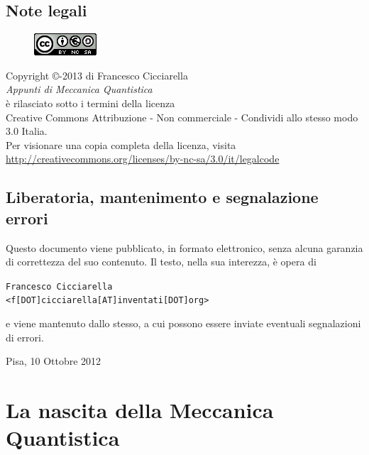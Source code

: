 \documentclass[12pt,a4paper]{report}
\theoremstyle{definition}
\numberwithin{equation}{section}
\begin{document}
\section*{Note legali}
\begin{center}
\begin{figure}[htbp]
\centering
\includegraphics[scale=1]{Addons/88x31.png}
\end{figure}
\vspace{0.5cm}
Copyright \copyright {}-2013 di Francesco Cicciarella \\
\textit{Appunti di Meccanica Quantistica} \\	
è rilasciato sotto i termini della licenza \\
Creative Commons Attribuzione - Non commerciale - Condividi allo stesso modo 3.0 Italia. \\
Per visionare una copia completa della licenza, visita \\
\url{http://creativecommons.org/licenses/by-nc-sa/3.0/it/legalcode}
\end{center}
\section*{Liberatoria, mantenimento e segnalazione errori}
Questo documento viene pubblicato, in formato elettronico, senza alcuna garanzia di correttezza del suo contenuto. Il testo, nella sua interezza, è opera di \\

\vspace{0.3cm}
\begin{flushleft}
\texttt{Francesco Cicciarella}\\
\texttt{<f[DOT]cicciarella[AT]inventati[DOT]org>}
\end{flushleft}
\vspace{0.3cm}
e viene mantenuto dallo stesso, a cui possono essere inviate eventuali segnalazioni di errori.
\vspace{1cm}
\begin{flushright}
Pisa, 10 Ottobre 2012
\end{flushright}
\pagebreak


\tableofcontents
\pagebreak
\chapter{La nascita della Meccanica Quantistica}
\end{document}
